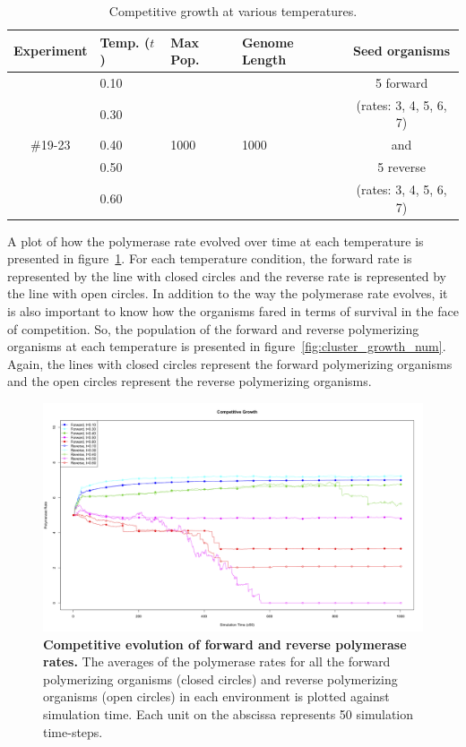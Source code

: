 \begin{table}
	\begin{center}
		\begin{tabular}[c]{ c | l | l | l | c }
			Experiment & Temp. ($t$) & Max Pop. & Genome Length & Seed organisms \\
			\hline
			& 0.10 & & & 5 forward\\
			& 0.30 & & & (rates: 3, 4, 5, 6, 7)\\
			\#19-23 & 0.40 & 1000 & 1000 & and\\
			& 0.50 & & & 5 reverse\\
			& 0.60 & & & (rates: 3, 4, 5, 6, 7)\\
		\end{tabular}
		\caption{Competitive growth at various temperatures.}
		\label{tab:cluster_growth}
	\end{center}
\end{table}

A plot of how the polymerase rate evolved over time at each temperature is presented in figure~\ref{fig:cluster_growth_rate}. For each temperature condition, the forward rate is represented by the line with closed circles and the reverse rate is represented by the line with open circles. In addition to the way the polymerase rate evolves, it is also important to know how the organisms fared in terms of survival in the face of competition. So, the population of the forward and reverse polymerizing organisms at each temperature is presented in figure~\ref{fig:cluster_growth_num}. Again, the lines with closed circles represent the forward polymerizing organisms and the open circles represent the reverse polymerizing organisms.

\begin{figure}[h]
	\centering
		\includegraphics[width=\textwidth]{cluster_growth_rate}
	\caption{\textbf{Competitive evolution of forward and reverse polymerase rates.} The averages of the polymerase rates for all the forward polymerizing organisms (closed circles) and reverse polymerizing organisms (open circles) in each environment is plotted against simulation time. Each unit on the abscissa represents 50 simulation time-steps.}
	\label{fig:cluster_growth_rate}
\end{figure}

